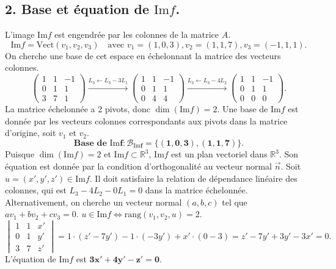 \documentclass[french]{yLectureNote}
\renewcommand{\vec}{\overrightarrow}
\renewcommand{\vec}{\overrightarrow}
\begin{document}
\subsection*{2. Base et équation de $\mathrm{Im}f$.}
L'image $\mathrm{Im}f$ est engendrée par les colonnes de la matrice $A$.
$$\mathrm{Im}f = \mathrm{Vect}(v_1, v_2, v_3) \quad \text{avec } v_1 = (1,0,3), v_2 = (1,1,7), v_3 = (-1,1,1).$$
On cherche une base de cet espace en échelonnant la matrice des vecteurs colonnes.
$$\begin{pmatrix} 1 & 1 & -1 \\ 0 & 1 & 1 \\ 3 & 7 & 1 \end{pmatrix} \xrightarrow{L_3 \leftarrow L_3 - 3L_1} \begin{pmatrix} 1 & 1 & -1 \\ 0 & 1 & 1 \\ 0 & 4 & 4 \end{pmatrix} \xrightarrow{L_3 \leftarrow L_3 - 4L_2} \begin{pmatrix} 1 & 1 & -1 \\ 0 & 1 & 1 \\ 0 & 0 & 0 \end{pmatrix}.$$
La matrice échelonnée a 2 pivots, donc $\dim(\mathrm{Im}f) = 2$.
Une base de $\mathrm{Im}f$ est donnée par les vecteurs colonnes correspondants aux pivots dans la matrice d'origine, soit $v_1$ et $v_2$.
$$\mathbf{\text{Base de } \mathrm{Im}f : \mathcal{B}_{\mathrm{Im}f} = \{(1,0,3), (1,1,7)\}.}$$
Puisque $\dim(\mathrm{Im}f)=2$ et $\mathrm{Im}f \subset \mathbb{R}^3$, $\mathrm{Im}f$ est un plan vectoriel dans $\mathbb{R}^3$. Son équation est donnée par la condition d'orthogonalité au vecteur normal $\vec{n}$.
Soit $u = (x',y',z') \in \mathrm{Im}f$. Il doit satisfaire la relation de dépendance linéaire des colonnes, qui est $L_3 - 4L_2 - 0L_1 = 0$ dans la matrice échelonnée.
Alternativement, on cherche un vecteur normal $(a,b,c)$ tel que $a v_1 + b v_2 + c v_3 = 0$.
$u \in \mathrm{Im}f \iff \mathrm{rang}(v_1, v_2, u) = 2$.
$$\begin{vmatrix} 1 & 1 & x' \\ 0 & 1 & y' \\ 3 & 7 & z' \end{vmatrix} = 1 \cdot (z' - 7y') - 1 \cdot (-3y') + x' \cdot (0-3) = z' - 7y' + 3y' - 3x' = 0.$$
L'équation de $\mathrm{Im}f$ est $\mathbf{3x' + 4y' - z' = 0}$.
\end{document}

